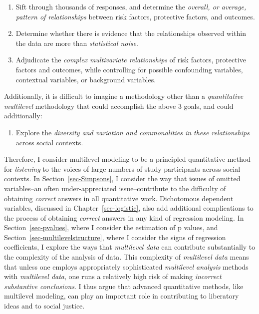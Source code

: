 \documentclass[
  letterpaper,
  DIV=11,
  numbers=noendperiod]{scrreprt}
\providecommand{\tightlist}{%
  \setlength{\itemsep}{0pt}\setlength{\parskip}{0pt}}\usepackage{longtable,booktabs,array}
\begin{document}
\begin{enumerate}
\def\labelenumi{\arabic{enumi}.}
\tightlist
\item
  Sift through thousands of responses, and determine the \emph{overall,
  or average, pattern of relationships} between risk factors, protective
  factors, and outcomes.
\item
  Determine whether there is evidence that the relationships observed
  within the data are more than \emph{statistical noise}.
\item
  Adjudicate the \emph{complex multivariate relationships} of risk
  factors, protective factors and outcomes, while controlling for
  possible confounding variables, contextual variables, or background
  variables.
\end{enumerate}

Additionally, it is difficult to imagine a methodology other than a
\emph{quantitative multilevel} methodology that could accomplish the
above 3 goals, and could additionally:

\begin{enumerate}
\def\labelenumi{\arabic{enumi}.}
\setcounter{enumi}{3}
\tightlist
\item
  Explore the \emph{diversity and variation and commonalities in these
  relationships} across social contexts. 
\end{enumerate}

Therefore, I consider multilevel modeling to be a principled
quantitative method for \emph{listening} to the voices of large numbers
of study participants across social contexts.  In
Section~\ref{sec-Simpsons}, I consider the way that issues of omitted
variables--an often under-appreciated issue--contribute to the
difficulty of obtaining \emph{correct} answers in all quantitative work.
Dichotomous dependent variables, discussed in
Chapter~\ref{sec-logistic}, also add additional complications to the
process of obtaining \emph{correct} answers in any kind of regression
modeling. In Section~\ref{sec-pvalues}, where I consider the estimation
of p values, and Section~\ref{sec-multilevelstructure}, where I consider
the signs of regression coefficients, I explore the ways that
\emph{multilevel data} can contribute substantially to the complexity of
the analysis of data. This complexity of \emph{multilevel data} means
that unless one employs appropriately sophisticated \emph{multilevel
analysis} methods with \emph{multilevel data}, one runs a relatively
high risk of making \emph{incorrect substantive conclusions}. I thus
argue that advanced quantitative methods, like multilevel modeling, can
play an important role in contributing to liberatory ideas and to social
justice.
\end{document}
